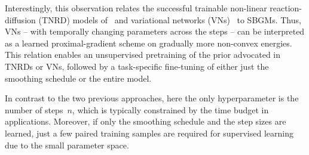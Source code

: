 \documentclass{article}
\theoremstyle{plain}
\theoremstyle{definition}
\theoremstyle{remark}
\begin{document}
Interestingly, this observation relates the successful trainable non-linear reaction-diffusion (TNRD) models of~\citet{ChPo16} and variational networks (VNs)~\citep{KoKl17,HaKl18,EfKo20} to SBGMs.
Thus, VNs -- with temporally changing parameters across the steps -- can be interpreted as a learned proximal-gradient scheme on gradually more non-convex energies.
This relation enables an unsupervised pretraining of the prior advocated in TNRDs or VNs, followed by a task-specific fine-tuning of either just the smoothing schedule or the entire model.

In contrast to the two previous approaches, here the only hyperparameter is the number of steps~$n$, which is typically constrained by the time budget in applications.
Moreover, if only the smoothing schedule and the step sizes are learned, just a few paired training samples are required for supervised learning due to the small parameter space.
\end{document}
